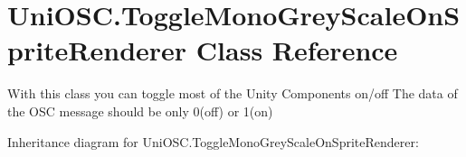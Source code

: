 \hypertarget{class_uni_o_s_c_1_1_toggle_mono_grey_scale_on_sprite_renderer}{}\section{Uni\+O\+S\+C.\+Toggle\+Mono\+Grey\+Scale\+On\+Sprite\+Renderer Class Reference}
\label{class_uni_o_s_c_1_1_toggle_mono_grey_scale_on_sprite_renderer}


With this class you can toggle most of the Unity Components on/off The data of the O\+SC message should be only 0(off) or 1(on)  




Inheritance diagram for Uni\+O\+S\+C.\+Toggle\+Mono\+Grey\+Scale\+On\+Sprite\+Renderer\+:
